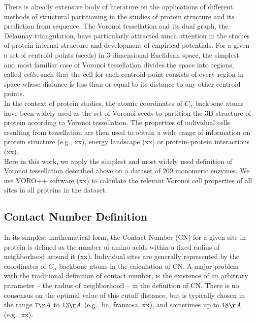 \documentclass[11pt]{article}
\begin{document}
        There is already extensive body of literature on the applications of different methods of structural partitioning in the studies of protein structure and its prediction from sequence. The Voronoi tessellation and its dual graph, the Delaunay triangulation, have particularly attracted much attention in the studies of protein internal structure and development of empirical potentials. For a given a set of centroid points (seeds) in 3-dimensional Euclidean space, the simplest and most familiar case of Voronoi tessellation divides the space into regions, called {\it cells}, such that the cell for each centroid point consists of every region in space whose distance is less than or equal to its distance to any other centroid points. \\

        In the context of protein studies, the atomic coordinates of $C_\alpha$ backbone atoms have been widely used as the set of Voronoi seeds to partition the 3D structure of protein according to Voronoi tessellation. The properties of individual cells resulting from tessellation are then used to obtain a wide range of information on protein structure (e.g., xx), energy landscape (xx) or protein--protein interactions (xx). \\

        Here in this work, we apply the simplest and most widely used definition of Voronoi tessellation described above on a dataset of $209$  monomeric enzymes. We use VORO++ software (xx) to calculate the relevant Voronoi cell properties of all sites in all proteins in the dataset.

    \subsection*{Contact Number Definition}

        In its simplest mathematical form, the Contact Number (CN) for a given site in protein is defined as the number of amino acids within a fixed radius of neighborhood around it (xx). Individual sites are generally represented by the coordinates of $C_\alpha$ backbone atoms in the calculation of CN. A major problem with the traditional definition of contact number, is the existence of an arbitrary parameter -- the radius of neighborhood --  in the definition of CN. There is no consensus on the optimal value of this cutoff distance, but is typically chosen in the range $7\AA$ to $13\AA$ (e.g., lin, franzosa, xx), and sometimes up to $18\AA$ (e.g., xx). \\
\end{document}
